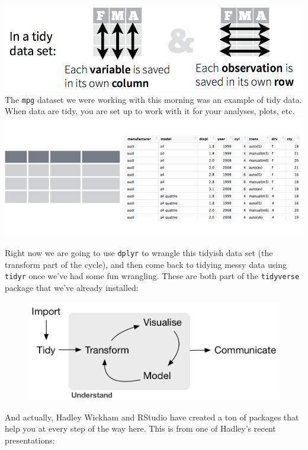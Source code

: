 \documentclass[]{book}
\theoremstyle{definition}
\theoremstyle{definition}
\theoremstyle{definition}
\theoremstyle{remark}
\begin{document}
\includegraphics{img/tidy_data.png} The \texttt{mpg} dataset we were
working with this morning was an example of tidy data. When data are
tidy, you are set up to work with it for your analyses, plots, etc.
\includegraphics{img/tidy_img_mpg.png}

Right now we are going to use \texttt{dplyr} to wrangle this tidyish
data set (the transform part of the cycle), and then come back to
tidying messy data using \texttt{tidyr} once we've had some fun
wrangling. These are both part of the \texttt{tidyverse} package that
we've already installed:

\begin{figure}
\centering
\includegraphics{img/r4ds_data-science.png}
\caption{}
\end{figure}

And actually, Hadley Wickham and RStudio have created a ton of packages
that help you at every step of the way here. This is from one of
Hadley's recent presentations:
\end{document}
